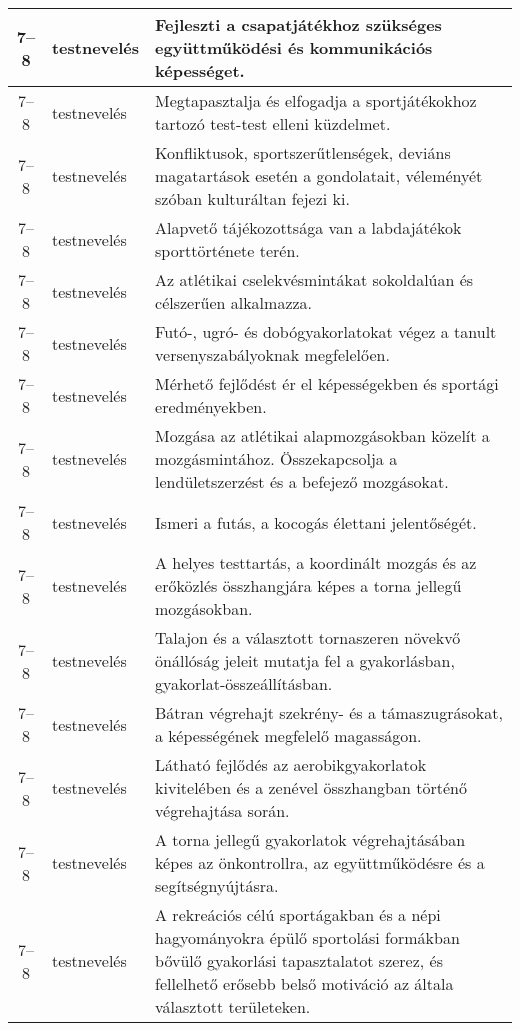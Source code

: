 \begin{small}
\begin{longtable}{c | p{2cm} |  p{11cm} }
              7--8 & testnevelés & Fejleszti a csapatjátékhoz szükséges együttműködési és kommunikációs képességet. \\ \hline
              7--8 & testnevelés & Megtapasztalja és elfogadja a sportjátékokhoz tartozó test-test elleni küzdelmet. \\ \hline
              7--8 & testnevelés & Konfliktusok, sportszerűtlenségek, deviáns magatartások esetén a gondolatait, véleményét szóban kulturáltan fejezi ki. \\ \hline
              7--8 & testnevelés & Alapvető tájékozottsága van a labdajátékok sporttörténete terén. \\ \hline
              7--8 & testnevelés & Az atlétikai cselekvésmintákat sokoldalúan és célszerűen alkalmazza. \\ \hline
              7--8 & testnevelés & Futó-, ugró- és dobógyakorlatokat végez a tanult versenyszabályoknak megfelelően. \\ \hline
              7--8 & testnevelés & Mérhető fejlődést ér el képességekben és sportági eredményekben. \\ \hline
              7--8 & testnevelés & Mozgása az atlétikai alapmozgásokban közelít a mozgásmintához. Összekapcsolja a lendületszerzést és a befejező mozgásokat. \\ \hline
              7--8 & testnevelés & Ismeri a futás, a kocogás élettani jelentőségét. \\ \hline
              7--8 & testnevelés & A helyes testtartás, a koordinált mozgás és az erőközlés összhangjára képes a torna jellegű mozgásokban. \\ \hline
              7--8 & testnevelés & Talajon és a választott tornaszeren növekvő önállóság jeleit mutatja fel a gyakorlásban, gyakorlat-összeállításban. \\ \hline
              7--8 & testnevelés & Bátran végrehajt szekrény- és a támaszugrásokat, a képességének megfelelő magasságon. \\ \hline
              7--8 & testnevelés & Látható fejlődés az aerobikgyakorlatok kivitelében és a zenével összhangban történő végrehajtása során. \\ \hline
              7--8 & testnevelés & A torna jellegű gyakorlatok végrehajtásában képes az önkontrollra, az együttműködésre és a segítségnyújtásra. \\ \hline
              7--8 & testnevelés & A rekreációs célú sportágakban és a népi hagyományokra épülő sportolási formákban bővülő gyakorlási tapasztalatot szerez, és fellelhető erősebb belső motiváció az általa választott területeken. \\ \hline

\end{longtable}
\end{small}
